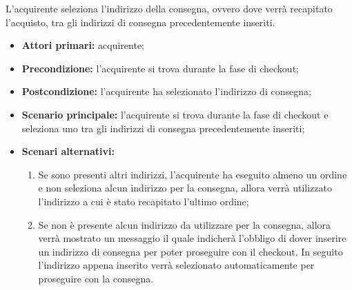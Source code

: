 L'acquirente seleziona l'indirizzo della consegna, ovvero dove verrà recapitato l'acquisto, tra gli indirizzi di consegna precedentemente inseriti.
\begin{itemize}
    \item \textbf{Attori primari:} acquirente;
    \item \textbf{Precondizione:} l'acquirente si trova durante la fase di checkout;
    \item \textbf{Postcondizione:} l'acquirente ha selezionato l'indirizzo di consegna;
    \item \textbf{Scenario principale:} l'acquirente si trova durante la fase di checkout e seleziona uno tra gli indirizzi di consegna precedentemente inseriti;
    \item \textbf{Scenari alternativi:}
    \begin{enumerate}[label=\lett]
        \item Se sono presenti altri indirizzi, l'acquirente ha eseguito almeno un ordine e non seleziona alcun indirizzo per la consegna, allora verrà utilizzato l'indirizzo a cui è stato recapitato l'ultimo ordine;
        \item Se non è presente alcun indirizzo da utilizzare per la consegna, allora verrà mostrato un messaggio il quale indicherà l'obbligo di dover inserire un indirizzo di consegna per poter proseguire con il checkout. In seguito l'indirizzo appena inserito verrà selezionato automaticamente per proseguire con la consegna.
    \end{enumerate}
\end{itemize}

